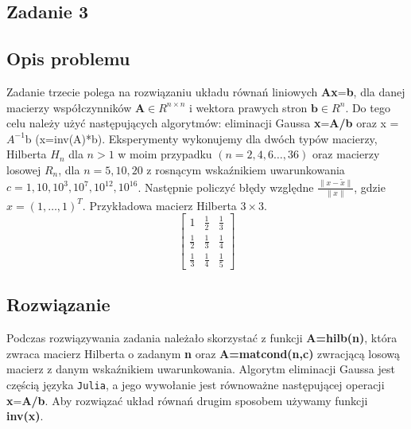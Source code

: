 \documentclass{article}
\begin{document}
\begin{center}
    \section{Zadanie 3}
    \subsection{Opis problemu}
    \large Zadanie trzecie polega na rozwiązaniu układu równań liniowych \textbf{Ax}=\textbf{b}, dla danej macierzy współczynników  \(\textbf{A} \in R^{n \times n}\) i wektora prawych stron  \(\textbf{b} \in R^n\).
     Do tego celu należy użyć następujących algorytmów: eliminacji Gaussa \textbf{x}=\textbf{A/b} oraz x = \textbf{\(A^{-1}\)}b (x=inv(A)*b).
     Eksperymenty wykonujemy dla dwóch typów macierzy, Hilberta \textbf{\(H_{n}\)} dla \(n>1\) w moim przypadku \((n = 2,4,6\ldots,36)\) oraz macierzy 
     losowej \textbf{\(R_{n}\)}, dla \(n = 5, 10, 20\) z rosnącym wskaźnikiem uwarunkowania \(c = 1,10,10^3,10^7,10^{12},10^{16}\). 
     Następnie policzyć błędy względne \(\frac{\|x - \tilde{x}\|}{\|x\|}\), gdzie \(x = (1,\ldots,1)^T\).
     Przykładowa macierz Hilberta \(3 \times 3\). 
     \[\left[\begin{matrix}    
        1 & \frac{1}{2} & \frac{1}{3} \\[6pt]
        \frac{1}{2} & \frac{1}{3} & \frac{1}{4} \\[6pt]
        \frac{1}{3} & \frac{1}{4} & \frac{1}{5}
     \end{matrix}\right]\]
    \subsection{Rozwiązanie}
    \large Podczas rozwiązywania zadania należało skorzystać z funkcji \textbf{A=hilb(n)}, która zwraca macierz Hilberta o zadanym \textbf{n} oraz 
     \textbf{A=matcond(n,c)} zwracjącą losową macierz z danym wskaźnikiem uwarunkowania. Algorytm eliminacji Gaussa jest częścią języka \texttt{Julia}, 
     a jego wywołanie jest równoważne następującej operacji \textbf{x}=\textbf{A/b}. Aby rozwiązać układ równań drugim sposobem używamy funkcji \textbf{inv(x)}.

\end{center}
\end{document}
